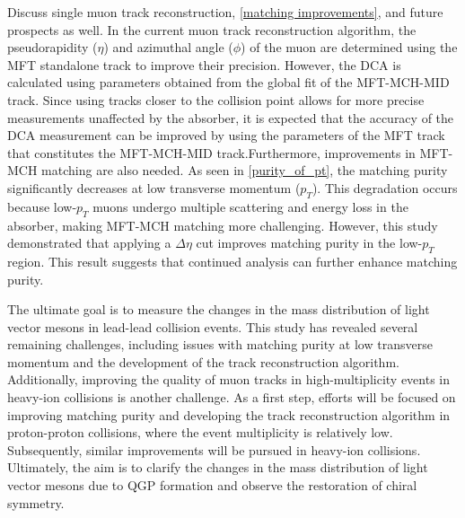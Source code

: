     Discuss single muon track reconstruction, \ref{matching improvements}, and future prospects as well. In the current muon track reconstruction algorithm, the pseudorapidity (\(\eta\)) and azimuthal angle (\(\phi\)) of the muon are determined using the MFT standalone track to improve their precision. However, the DCA is calculated using parameters obtained from the global fit of the MFT-MCH-MID track. Since using tracks closer to the collision point allows for more precise measurements unaffected by the absorber, it is expected that the accuracy of the DCA measurement can be improved by using the parameters of the MFT track that constitutes the MFT-MCH-MID track.Furthermore, improvements in MFT-MCH matching are also needed. As seen in \ref{purity_of_pt}, the matching purity significantly decreases at low transverse momentum (\( p_T \)). This degradation occurs because low-\( p_T \) muons undergo multiple scattering and energy loss in the absorber, making MFT-MCH matching more challenging. However, this study demonstrated that applying a \( \Delta \eta \) cut improves matching purity in the low-\( p_T \) region. This result suggests that continued analysis can further enhance matching purity.

    The ultimate goal is to measure the changes in the mass distribution of light vector mesons in lead-lead collision events. This study has revealed several remaining challenges, including issues with matching purity at low transverse momentum and the development of the track reconstruction algorithm. Additionally, improving the quality of muon tracks in high-multiplicity events in heavy-ion collisions is another challenge. As a first step, efforts will be focused on improving matching purity and developing the track reconstruction algorithm in proton-proton collisions, where the event multiplicity is relatively low. Subsequently, similar improvements will be pursued in heavy-ion collisions. Ultimately, the aim is to clarify the changes in the mass distribution of light vector mesons due to QGP formation and observe the restoration of chiral symmetry.
